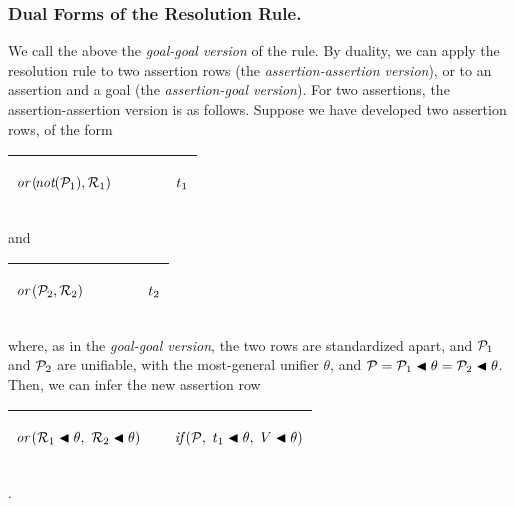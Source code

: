 \documentclass[runningheads]{llncs}
\DeclareMathOperator{\uor}{\emph{or}\,}
\DeclareMathOperator{\unot}{\emph{not}\kern-.0pt}
\begin{document}
 
\subsubsection{Dual Forms of the Resolution Rule.}  We call the above the \emph{goal-goal version} of the rule.  By duality, we can apply the resolution rule to two assertion rows (the \emph{assertion-assertion version}), or to an assertion and a goal (the \emph{assertion-goal version}).  For two assertions, the assertion-assertion version is as follows. Suppose we have developed two assertion rows, of the form



   \begin{center}
\begin{tabular}{T}
\hline
   \begin{center} $\uor(\!\unot(\expsub{\mathcal{P}}{1}),\expsub{\mathcal{R}}{1})$\end{center} & 
   $\qquad$ 
   & \begin{center}${t}_{1}$\end{center}\\
  \hline
\end{tabular}
\end{center}


\noindent and
  \begin{center}
\begin{tabular} {T}
\hline
  \begin{center}  $ \uor(\expsub{\mathcal{P}}{2},\expsub{\mathcal{R}}{2})$ \end{center} 
    &  $\qquad$ 
    &\begin{center} ${t}_{2}$ \end{center}\\
  \hline
\end{tabular}
\end{center}
 
\noindent where, as in the \emph{goal-goal version}, the two rows are standardized apart, and ${\mathcal{P}}_{1}$ and ${\mathcal{P}}_{2}$ are unifiable, with the most-general unifier $\theta$, and $ \mathcal{P} = {\mathcal{P}}_{1} \blacktriangleleft \theta = {\mathcal{P}}_{2} \blacktriangleleft \theta$.  Then, we can infer the new assertion row

 
 


\begin{center}
\begin{tabular}{T}
\hline
  \begin{center} $\uor(\expsub{\mathcal{R}}{1} \apply \theta, \ \expsub{\mathcal{R}}{2} \apply \theta) $ \end{center}& &
   \begin{center} $\emph{if}\,( {\mathcal{P}},\allowbreak \ {{t}_{1} \blacktriangleleft \theta},\allowbreak \ {V \blacktriangleleft \theta})$ \end{center}
  \\
  \hline
\end{tabular}.
\end{center}
\end{document}
